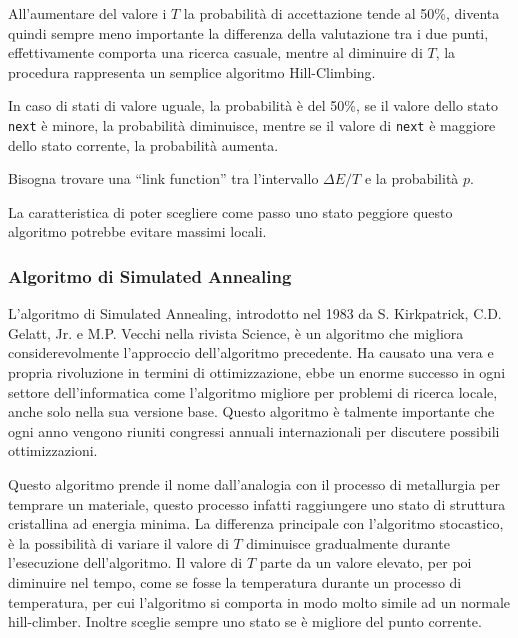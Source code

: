 \documentclass{article}
\numberwithin{equation}{subsection}
\begin{document}

All'aumentare del valore i $T$ la probabilità di accettazione tende al 50\%, diventa quindi sempre meno importante la differenza della valutazione tra i due punti, 
effettivamente comporta una ricerca casuale, mentre al diminuire di $T$, la procedura rappresenta un semplice algoritmo Hill-Climbing. 

In caso di stati di valore uguale, la probabilità è del 50\%, se il valore dello stato \verb|next| è minore, la probabilità diminuisce, mentre se il valore di \verb|next| 
è maggiore dello stato corrente, la probabilità aumenta. 


Bisogna trovare una ``link function'' tra l'intervallo $\Delta E/T$ e la probabilità $p$. 


La caratteristica di poter scegliere come passo uno stato peggiore questo algoritmo potrebbe evitare massimi locali. 

\subsubsection{Algoritmo di Simulated Annealing}

L'algoritmo di Simulated Annealing, introdotto nel 1983 da S. Kirkpatrick, C.D. Gelatt, Jr. e M.P. Vecchi nella rivista Science, è un algoritmo che migliora 
considerevolmente l'approccio dell'algoritmo precedente. Ha causato una vera e propria rivoluzione in termini di ottimizzazione, ebbe un enorme successo in ogni 
settore dell'informatica come l'algoritmo migliore per problemi di ricerca locale, anche solo nella sua versione base.  
Questo algoritmo è talmente importante che ogni anno vengono riuniti congressi annuali internazionali per discutere possibili ottimizzazioni. 


Questo algoritmo prende il nome dall'analogia con il processo di metallurgia per temprare un materiale, questo processo infatti raggiungere uno stato di struttura 
cristallina ad energia minima. La differenza principale con l'algoritmo stocastico, è la possibilità di variare il valore di $T$ diminuisce gradualmente durante l'esecuzione 
dell'algoritmo. Il valore di $T$ parte da un valore elevato, per poi diminuire nel tempo, come se fosse la temperatura durante un processo di temperatura, per cui l'algoritmo si 
comporta in modo molto simile ad un normale hill-climber. Inoltre sceglie sempre uno stato 
se è migliore del punto corrente. 
\end{document}
